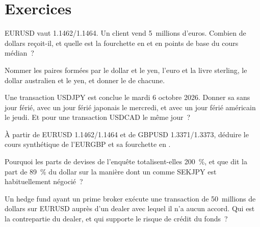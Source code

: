 \section{Exercices}

\begin{exercise}[$\star$]\label{exo:m2:the-fx-market:1}
EURUSD vaut 1.1462/1.1464. Un client vend 5~millions d'euros. Combien de dollars
reçoit-il, et quelle est la fourchette en  et en points de base du cours médian~?
\end{exercise}

\begin{exercise}[$\star$]\label{exo:m2:the-fx-market:2}
Nommer les paires formées par le dollar et le yen, l'euro et la livre sterling, le
dollar australien et le yen, et donner le  de chacune.
\end{exercise}

\begin{exercise}[$\star$]\label{exo:m2:the-fx-market:3}
Une transaction USDJPY est conclue le mardi 6 octobre 2026. Donner sa  sans
jour férié, avec un jour férié japonais le mercredi, et avec un jour férié américain le
jeudi. Et pour une transaction USDCAD le même jour~?
\end{exercise}

\begin{exercise}[$\star\star$]\label{exo:m2:the-fx-market:4}
À partir de EURUSD 1.1462/1.1464 et de GBPUSD 1.3371/1.3373, déduire le cours synthétique
de l'EURGBP et sa fourchette en .
\end{exercise}

\begin{exercise}[$\star\star$]\label{exo:m2:the-fx-market:5}
Pourquoi les parts de devises de l'enquête totalisent-elles 200~\%, et que dit la part de
89~\% du dollar sur la manière dont un  comme SEKJPY est habituellement négocié~?
\end{exercise}

\begin{exercise}[$\star\star$]\label{exo:m2:the-fx-market:6}
Un hedge fund ayant un prime broker exécute une transaction de 50~millions de dollars sur
EURUSD auprès d'un dealer avec lequel il n'a aucun accord. Qui est la contrepartie du dealer,
et qui supporte le risque de crédit du fonds~?
\end{exercise}

